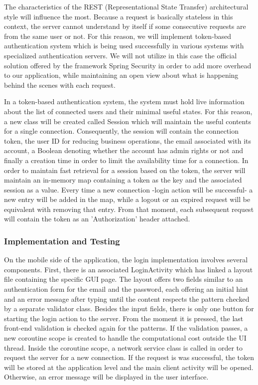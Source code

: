 The characteristics of the REST (Representational State Transfer) architectural style will influence the most. Because a request is basically stateless in this context, the server cannot understand by itself if some consecutive requests are from the same user or not. For this reason, we will implement token-based authentication system which is being used successfully in various systems with specialized authentication servers. We will not utilize in this case the official solution offered by the framework Spring Security in order to add more overhead to our application, while maintaining an open view about what is happening behind the scenes with each request.

In a token-based authentication system, the system must hold live information about the list of connected users and their minimal useful states. For this reason, a new class will be created called Session which will maintain the useful contents for a single connection. Consequently, the session will contain the connection token, the user ID for reducing business operations, the email associated with its account, a Boolean denoting whether the account has admin rights or not and finally a creation time in order to limit the availability time for a connection. In order to maintain fast retrieval for a session based on the token, the server will maintain an in-memory map containing a token as the key and the associated session as a value. Every time a new connection -login action will be successful- a new entry will be added in the map, while a logout or an expired request will be equivalent with removing that entry. From that moment, each subsequent request will contain the token as an 'Authorization' header attached.


\subsubsection{Implementation and Testing}

On the mobile side of the application, the login implementation involves several components. First, there is an associated LoginActivity which has linked a layout file containing the specific GUI page. The layout offers two fields similar to an authentication form for the email and the password, each offering an initial hint and an error message after typing until the content respects the pattern checked by a separate validator class. Besides the input fields, there is only one button for starting the login action to the server. From the moment it is pressed, the last front-end validation is checked again for the patterns. If the validation passes, a new coroutine scope is created to handle the computational cost outside the UI thread. Inside the coroutine scope, a network service class is called in order to request the server for a new connection. If the request is was successful, the token will be stored at the application level and the main client activity will be opened. Otherwise, an error message will be displayed in the user interface.


